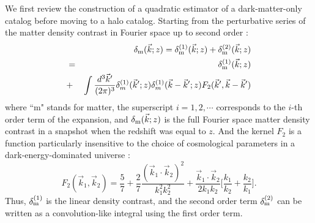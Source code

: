 \documentclass[prd,amsmath,amssymb,floatfix,superscriptaddress,nofootinbib,twocolumn]{revtex4-1}
\def\be{\begin{equation}}
\def\ee{\end{equation}}
\def\bea{\begin{eqnarray}}
\def\eea{\end{eqnarray}}
\newcommand{\vs}{\nonumber\\}
\newcommand{\vk}{\vec{k}}
\newcommand{\eql}[1]{\label{eq:#1}}
\begin{document}
\noindent We first review the construction of a quadratic estimator of a dark-matter-only catalog \cite{Li:2020fir} before moving to a halo catalog. Starting from the perturbative series of the matter density contrast in Fourier space up to second order \cite{Jain:1994sop}\cite{Bernardeau:2002rev}:
\bea
&&\delta_{\rm m}(\vk;z)=\delta^{(1)}_{\rm m}(\vk;z)+\delta^{(2)}_{\rm m}(\vk;z)\vs
&=&\delta^{(1)}_{\rm m}(\vk;z)\vs
&+&\int \frac{d^{3}\vec{k}'}{(2\pi)^3}\delta^{(1)}_{m}(\vec{k}';z)\delta^{(1)}_{m}(\vec{k}-\vec{k}';z){F}_{2}(\vec{k}',\vec{k}-\vec{k}') \eql{tayl}
\eea 
where ``m" stands for matter, the superscript $i=1,2,\cdots$ corresponds to the $i$-th order term of the expansion, and $\delta_{\rm m}(\vk;z)$ is the full Fourier space matter density contrast in a snapshot when the redshift was equal to $z$. And the kernel $F_{2}$ is a function particularly insensitive to the choice of cosmological parameters in a dark-energy-dominated universe \cite{Takahashi:2008to}:
\be
F_{2}(\vk_1,\vk_2)=\frac{5}{7}+\frac{2}{7}\frac{(\vk_1\cdot \vk_2)^2}{k_1^2 k_2^2}+\frac{\vk_1\cdot \vk_2}{2k_1k_2}\bigg[\frac{k_1}{k_2}+\frac{k_2}{k_1}\bigg].\eql{f2}
\ee
Thus, $\delta_{\rm m}^{(1)}$ is the linear density contrast, and the second order term $\delta_{\rm m}^{(2)}$ can be written as a convolution-like integral using the first order term.
\end{document}
